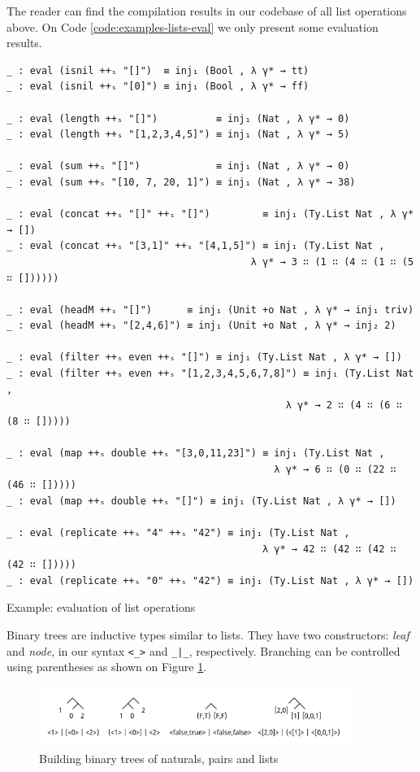 The reader can find the compilation results in our codebase of all list operations above. On Code \ref{code:examples-lists-eval} we only present some evaluation results.

\begin{listing}[H]
\begin{verbatim}
_ : eval (isnil ++ₛ "[]")  ≡ inj₁ (Bool , λ γ* → tt)
_ : eval (isnil ++ₛ "[0]") ≡ inj₁ (Bool , λ γ* → ff)

_ : eval (length ++ₛ "[]")          ≡ inj₁ (Nat , λ γ* → 0)
_ : eval (length ++ₛ "[1,2,3,4,5]") ≡ inj₁ (Nat , λ γ* → 5)

_ : eval (sum ++ₛ "[]")             ≡ inj₁ (Nat , λ γ* → 0)
_ : eval (sum ++ₛ "[10, 7, 20, 1]") ≡ inj₁ (Nat , λ γ* → 38)

_ : eval (concat ++ₛ "[]" ++ₛ "[]")         ≡ inj₁ (Ty.List Nat , λ γ* → [])
_ : eval (concat ++ₛ "[3,1]" ++ₛ "[4,1,5]") ≡ inj₁ (Ty.List Nat ,
                                          λ γ* → 3 ∷ (1 ∷ (4 ∷ (1 ∷ (5 ∷ [])))))

_ : eval (headM ++ₛ "[]")      ≡ inj₁ (Unit +o Nat , λ γ* → inj₁ triv)
_ : eval (headM ++ₛ "[2,4,6]") ≡ inj₁ (Unit +o Nat , λ γ* → inj₂ 2)

_ : eval (filter ++ₛ even ++ₛ "[]") ≡ inj₁ (Ty.List Nat , λ γ* → [])
_ : eval (filter ++ₛ even ++ₛ "[1,2,3,4,5,6,7,8]") ≡ inj₁ (Ty.List Nat ,
                                                λ γ* → 2 ∷ (4 ∷ (6 ∷ (8 ∷ []))))

_ : eval (map ++ₛ double ++ₛ "[3,0,11,23]") ≡ inj₁ (Ty.List Nat ,
                                              λ γ* → 6 ∷ (0 ∷ (22 ∷ (46 ∷ []))))
_ : eval (map ++ₛ double ++ₛ "[]") ≡ inj₁ (Ty.List Nat , λ γ* → [])

_ : eval (replicate ++ₛ "4" ++ₛ "42") ≡ inj₁ (Ty.List Nat ,
                                            λ γ* → 42 ∷ (42 ∷ (42 ∷ (42 ∷ []))))
_ : eval (replicate ++ₛ "0" ++ₛ "42") ≡ inj₁ (Ty.List Nat , λ γ* → [])
\end{verbatim}
\caption{Example: evaluation of list operations}
\label{code:examples-lists-eval}
\end{listing}

Binary trees are inductive types similar to lists. They have two constructors: \textit{leaf} and \textit{node}, in our syntax \verb$<_>$ and \verb$_|_$, respectively. Branching can be controlled using parentheses as shown on Figure \ref{fig:tree-example}.

\begin{figure}[h!]
	\centering
	\includegraphics[width=0.9\textwidth]{../images/tree-example.png}
	\caption{Building binary trees of naturals, pairs and lists}
	\label{fig:tree-example}
\end{figure}


